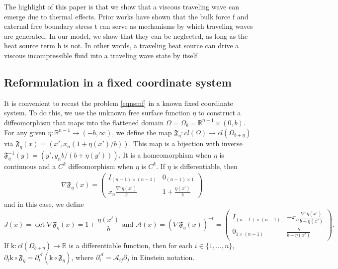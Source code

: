 \documentclass[11pt,letterpaper,reqno]{amsart}
\numberwithin{equation}{section}
\begin{document}
The highlight of this paper is that we show that a viscous traveling wave can emerge due to thermal effects. Prior works have shown that the bulk force $\mathrm{f}$ and external free boundary stress $\mathrm{t}$ can serve as mechanisms by which traveling waves are generated. In our model, we show that they can be neglected, as long as the heat source term $\mathrm{h}$ is not.  In other words, a traveling heat source can drive a viscous incompressible fluid into a traveling wave state by itself.




 


\subsection{Reformulation in a fixed coordinate system}

It is convenient to recast the problem \eqref{eqnsmf} in a known fixed coordinate system. To do this, we use the unknown free surface function $\eta$ to construct a diffeomorphism that maps into the flattened domain $\Omega = \Omega_b = \mathbb{R}^{n-1} \times (0,b)$. For any given  $\eta : \mathbb{R}^{n-1} \to (-b,\infty)$, we define the map \(\mathfrak{F}_{\eta}: cl(\Omega) \to cl(\Omega_{b+\eta})\) via $ \mathfrak{F}_{\eta}(x) = (x',x_n(1+ \eta(x')/b))$.
This map is a bijection with inverse $\mathfrak{F}_{\eta}^{-1}(y)=(y',y_{n}b/(b+\eta(y')))$. It is a homeomorphism when $\eta$ is continuous and a $C^k$ diffeomorphism when $\eta$ is $C^k$.  If \(\eta\) is differentiable, then
\begin{align}
    &\nabla \mathfrak{F}_{\eta}(x) =
    \begin{pmatrix}
        I_{(n-1) \times (n-1)} & 0_{(n-1) \times 1} \\
        x_{n}\frac{\nabla' \eta(x')}{b} & 1+\frac{\eta(x')}{b}
    \end{pmatrix}
\end{align}
and in this case, we define
\begin{equation} \label{AJ}
    J(x)= \det\nabla \mathfrak{F}_{\eta}(x) = 1+\frac{\eta(x')}{b} \text{ and } \mathcal{A}(x) = (\nabla \mathfrak{F}_{\eta}(x))^{-t} =
    \begin{pmatrix}
        I_{(n-1) \times (n-1)} & -x_{n}\frac{\nabla' \eta(x')}{b+\eta(x')} \\
        0_{1 \times (n-1)} & \frac{b}{b+\eta(x')}
    \end{pmatrix}
    .
\end{equation}
If \(\mathrm{k}: cl(\Omega_{b+\eta}) \to \mathbb{R}\) is a differentiable function, then for each \(i \in \{1, \dots, n\}\), \(\partial_{i}\mathrm{k} \circ \mathfrak{F}_\eta = \partial_{i}^{\mathcal{A}}(\mathrm{k} \circ \mathfrak{F}_{\eta})\), where \(\partial_{i}^{\mathcal{A}}=\mathcal{A}_{ij}\partial_{j}\) in Einstein notation.
\end{document}

